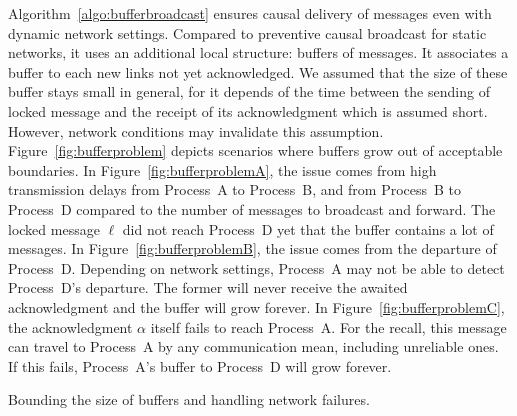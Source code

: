 Algorithm~\ref{algo:bufferbroadcast} ensures causal delivery of messages even
with dynamic network settings. Compared to preventive causal broadcast for
static networks, it uses an additional local structure: buffers of messages. It
associates a buffer to each new links not yet acknowledged. We assumed that the
size of these buffer stays small in general, for it depends of the time between
the sending of locked message and the receipt of its acknowledgment which is
assumed short. However, network conditions may invalidate this
assumption. Figure~\ref{fig:bufferproblem} depicts scenarios where buffers grow
out of acceptable boundaries. In Figure~\ref{fig:bufferproblemA}, the issue
comes from high transmission delays from Process~A to Process~B, and from
Process~B to Process~D compared to the number of messages to broadcast and
forward. The locked message $\ell$ did not reach Process~D yet that the buffer
contains a lot of messages. In Figure~\ref{fig:bufferproblemB}, the issue comes
from the departure of Process~D. Depending on network settings, Process~A may
not be able to detect Process~D's departure. The former will never receive the
awaited acknowledgment and the buffer will grow forever. In
Figure~\ref{fig:bufferproblemC}, the acknowledgment $\alpha$ itself fails to
reach Process~A. For the recall, this message can travel to Process~A by any
communication mean, including unreliable ones. If this fails, Process~A's buffer
to Process~D will grow forever. %

\begin{algorithm}
  
  \caption{\label{algo:boundingbuffer}Bounding the size of buffers and handling
    network failures.}
\end{algorithm}

